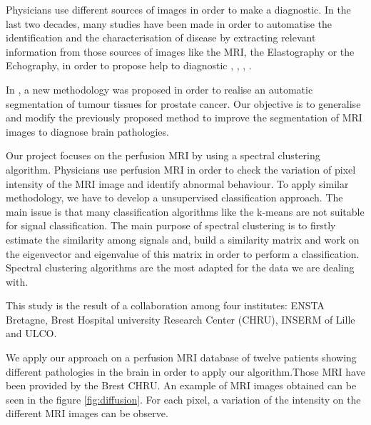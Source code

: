 Physicians use different sources of images in order to make a diagnostic. In the last two decades, many studies have been made in order to automatise the identification and the characterisation of disease by extracting relevant information from those sources of images like the MRI, the Elastography or the Echography, in order to propose help to diagnostic \cite{tartare2014contribution}, \cite{schmitt2011characterization}, \cite{schmitt2013shear}, \cite{ophir1991elastography}.

In \cite{tartare2014contribution}, a new methodology was proposed in order to realise an automatic segmentation of tumour tissues for prostate cancer. Our objective is to generalise and modify the previously proposed method to improve the segmentation of MRI images to diagnose brain pathologies.

Our project focuses on the perfusion MRI by using a spectral clustering algorithm. Physicians use perfusion MRI in order to check the variation of pixel intensity of the MRI image and identify abnormal behaviour. To apply similar methodology, we have to develop a unsupervised classification approach. The main issue is that many classification algorithms like the k-means are not suitable for signal classification. The main purpose of spectral clustering is to firstly estimate the similarity among signals and, build a similarity matrix and work on the eigenvector and eigenvalue of this matrix in order to perform a classification. Spectral clustering algorithms are the most adapted for the data we are dealing with.

This study is the result of a collaboration among four institutes: ENSTA Bretagne, Brest Hospital university Research Center (CHRU), INSERM of Lille and ULCO.

We apply our approach on a perfusion MRI database of twelve patients showing different pathologies in the brain in order to apply our algorithm.Those MRI have been provided by the Brest CHRU. An example of MRI images obtained can be seen in the figure \ref{fig:diffusion}. For each pixel, a variation of the intensity on the different MRI images can be observe.

